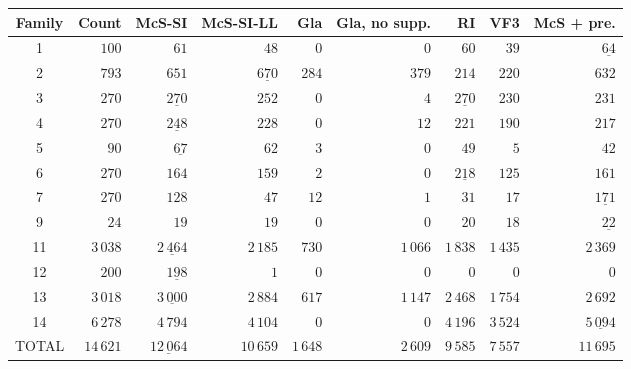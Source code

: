 
\begin{tabular}{crrrrrrrr}
    \toprule
    Family & Count & McS-SI & McS-SI-LL & Gla & Gla, no supp. & RI & VF3 & McS + pre.\\
    \midrule

1 & $100$ & $61$ & $48$ & $0$ & $0$ & $60$ & $39$ & $\underline{64}$\\
2 & $793$ & $651$ & $\underline{670}$ & $284$ & $379$ & $214$ & $220$ & $632$\\
3 & $270$ & $\underline{270}$ & $252$ & $0$ & $4$ & $\underline{270}$ & $230$ & $231$\\
4 & $270$ & $\underline{248}$ & $228$ & $0$ & $12$ & $221$ & $190$ & $217$\\
5 & $90$ & $\underline{67}$ & $62$ & $3$ & $0$ & $49$ & $5$ & $42$\\
6 & $270$ & $164$ & $159$ & $2$ & $0$ & $\underline{218}$ & $125$ & $161$\\
7 & $270$ & $128$ & $47$ & $12$ & $1$ & $31$ & $17$ & $\underline{171}$\\
9 & $24$ & $19$ & $19$ & $0$ & $0$ & $20$ & $18$ & $\underline{22}$\\
11 & $3\,038$ & $\underline{2\,464}$ & $2\,185$ & $730$ & $1\,066$ & $1\,838$ & $1\,435$ & $2\,369$\\
12 & $200$ & $\underline{198}$ & $1$ & $0$ & $0$ & $0$ & $0$ & $0$\\
13 & $3\,018$ & $\underline{3\,000}$ & $2\,884$ & $617$ & $1\,147$ & $2\,468$ & $1\,754$ & $2\,692$\\
14 & $6\,278$ & $4\,794$ & $4\,104$ & $0$ & $0$ & $4\,196$ & $3\,524$ & $\underline{5\,094}$\\
TOTAL & $14\,621$ & $\underline{12\,064}$ & $10\,659$ & $1\,648$ & $2\,609$ & $9\,585$ & $7\,557$ & $11\,695$\\

    \bottomrule
\end{tabular}


